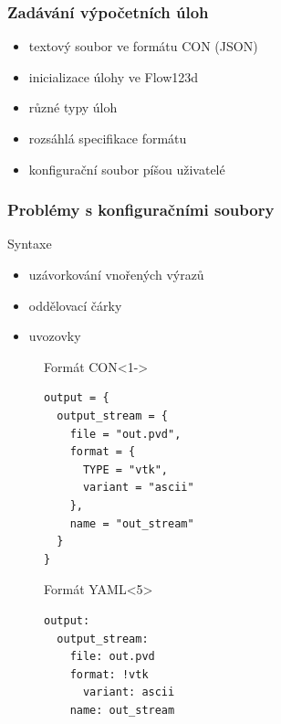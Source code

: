 \documentclass{beamer}
\begin{document}
\begin{frame}
	\frametitle{Zadávání výpočetních úloh}
	\begin{itemize}[<+>]
		\item textový soubor ve formátu CON (JSON)
		\item inicializace úlohy ve Flow123d
		\item různé typy úloh
		\item rozsáhlá specifikace formátu
		\item konfigurační soubor píšou uživatelé
	\end{itemize}
\end{frame}

\begin{frame}[fragile]
	\frametitle{Problémy s konfiguračními soubory}
	Syntaxe
	\begin{itemize}
		\item<2> uzávorkování vnořených výrazů
		\item<3> oddělovací čárky
		\item<4> uvozovky
	\end{itemize}

\vspace*{-0.5cm}
\begin{figure}[ht]
\begin{minipage}[t]{0.45\linewidth}
\begin{exampleblock}{Formát CON}<1->
\begin{lstlisting}
output = {
  output_stream = {
    file = "out.pvd", 
    format = {
      TYPE = "vtk", 
      variant = "ascii"
    }, 
    name = "out_stream"
  }
}
\end{lstlisting}
\end{exampleblock}
\end{minipage}
\begin{minipage}[t]{0.45\linewidth}
\begin{exampleblock}{Formát YAML}<5>
\begin{lstlisting}
output:
  output_stream:
  	file: out.pvd
  	format: !vtk
  	  variant: ascii
  	name: out_stream
\end{lstlisting}
\end{exampleblock}
\end{minipage}
\end{figure}	
\end{frame}
\end{document}
